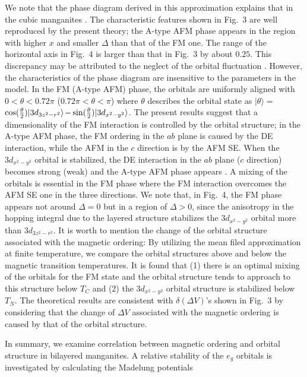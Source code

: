 We note that the phase diagram derived in this approximation
explains that in the cubic manganites \cite{okamoto}.
The characteristic features shown in Fig.~3
are well reproduced by the present theory;
the A-type AFM phase appears in the region with higher $x$
and smaller $\Delta $ than that of the FM one.
The range of the horizontal axis in Fig.~4 is larger than
that in Fig.~3 by about $0.25$.
This discrepancy may be attributed to the neglect of the orbital fluctuation \cite{ishihara3}.
However, the characteristics of the phase diagram
are insensitive to the parameters in the model.
In the FM (A-type AFM) phase, the orbitals are uniformly aligned
with $ 0<\theta <0.72\pi$ ($0.72\pi<\theta<\pi$)
where $\theta$ describes the orbital state as
$|\theta \rangle=
$$
\cos({\theta \over 2})|3d_{3z^2-r^2}\rangle
$$
-\sin({\theta \over 2})|3d_{x^2-y^2} \rangle$.
The present results suggest that
a dimensionality of the FM interaction is controlled by
the orbital structure;
in the A-type AFM phase,
the FM ordering in the $ab$ plane
is caused by the DE interaction, while the AFM in the $c$ direction is by the AFM SE.
When the $3d_{x^2-y^2}$ orbital is stabilized,
the DE interaction in the $ab$ plane ($c$ direction) becomes strong (weak)
and the A-type AFM phase appears \cite{maezono1}.
A mixing of the orbitals is essential in the FM phase
where the FM interaction overcomes the AFM SE one in the three directions.
We note that, in Fig.~4, the FM phase appears not around $\Delta=0$
but in a region of $\Delta>0$,
since the anisotropy in the hopping integral due to the layered structure
stabilizes the $3d_{x^2-y^2}$ orbital more than $3d_{3z^2-r^2}$.
It is worth to mention the change of the orbital structure associated with
the magnetic ordering:
By utilizing the mean filed approximation at finite temperature,
we compare the orbital structures above and below the magnetic
transition temperatures.
It is found that (1)
there is an optimal mixing of the orbitals for the FM state
and the orbital structure tends to approach to this structure below $T_C$
and
(2) the $3d_{x^2-y^2}$ orbital structure is stabilized below $T_N$.
The theoretical results are consistent with $\delta (\Delta V)$'s shown in Fig.~3
by considering that the change of $\Delta V$
associated with the magnetic ordering is caused by that of the orbital structure.
\par
In summary,
we examine correlation between magnetic ordering and orbital structure
in bilayered manganites.
A relative stability of the $e_g$ orbitals is
investigated by calculating
the Madelung potentials
